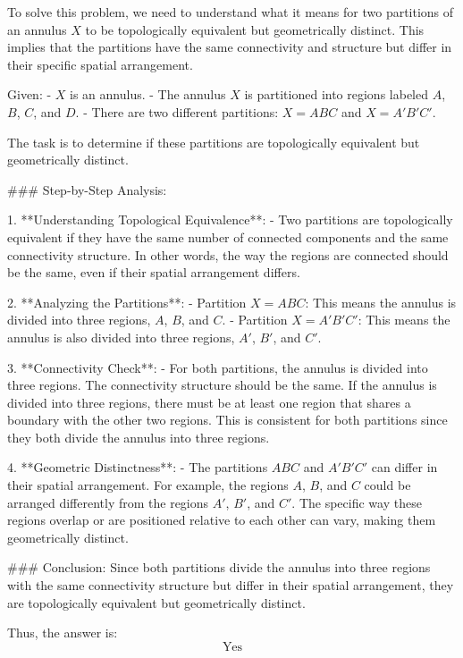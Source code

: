 To solve this problem, we need to understand what it means for two partitions of an annulus \(X\) to be topologically equivalent but geometrically distinct. This implies that the partitions have the same connectivity and structure but differ in their specific spatial arrangement.

Given:
- \(X\) is an annulus.
- The annulus \(X\) is partitioned into regions labeled \(A\), \(B\), \(C\), and \(D\).
- There are two different partitions: \(X = ABC\) and \(X = A'B'C'\).

The task is to determine if these partitions are topologically equivalent but geometrically distinct.

### Step-by-Step Analysis:

1. **Understanding Topological Equivalence**:
   - Two partitions are topologically equivalent if they have the same number of connected components and the same connectivity structure. In other words, the way the regions are connected should be the same, even if their spatial arrangement differs.

2. **Analyzing the Partitions**:
   - Partition \(X = ABC\): This means the annulus is divided into three regions, \(A\), \(B\), and \(C\).
   - Partition \(X = A'B'C'\): This means the annulus is also divided into three regions, \(A'\), \(B'\), and \(C'\).

3. **Connectivity Check**:
   - For both partitions, the annulus is divided into three regions. The connectivity structure should be the same. If the annulus is divided into three regions, there must be at least one region that shares a boundary with the other two regions. This is consistent for both partitions since they both divide the annulus into three regions.

4. **Geometric Distinctness**:
   - The partitions \(ABC\) and \(A'B'C'\) can differ in their spatial arrangement. For example, the regions \(A\), \(B\), and \(C\) could be arranged differently from the regions \(A'\), \(B'\), and \(C'\). The specific way these regions overlap or are positioned relative to each other can vary, making them geometrically distinct.

### Conclusion:
Since both partitions divide the annulus into three regions with the same connectivity structure but differ in their spatial arrangement, they are topologically equivalent but geometrically distinct.

Thus, the answer is:
\[
\boxed{\text{Yes}}
\]